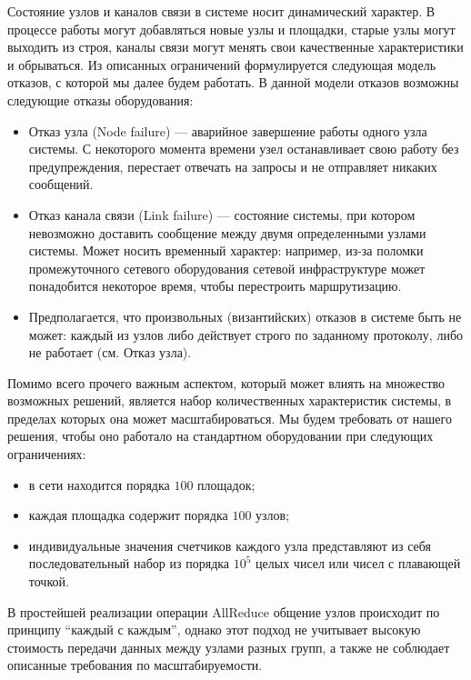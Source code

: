 \documentclass{article}
\theoremstyle{plain}
\theoremstyle{plain}
\theoremstyle{plain}
\theoremstyle{plain}
\theoremstyle{definition}
\theoremstyle{remark}
\theoremstyle{plain}
\begin{document}
Состояние узлов и каналов связи в системе носит динамический характер. В процессе работы могут добавляться новые узлы и площадки, старые узлы могут выходить из строя, каналы связи могут менять свои качественные характеристики и обрываться. Из описанных ограничений формулируется следующая модель отказов, с которой мы далее будем работать. В данной модели отказов возможны следующие отказы оборудования:

\begin{itemize}
    \item Отказ узла (Node failure) — аварийное завершение работы одного узла системы. С некоторого момента времени узел останавливает свою работу без предупреждения, перестает отвечать на запросы и не отправляет никаких сообщений.
    
    \item Отказ канала связи (Link failure) — состояние системы, при котором невозможно доставить сообщение между двумя определенными узлами системы. Может носить временный характер: например, из-за поломки промежуточного сетевого оборудования сетевой инфраструктуре может понадобится некоторое время, чтобы перестроить маршрутизацию.
    
    \item Предполагается, что произвольных (византийских) отказов в системе быть не может: каждый из узлов либо действует строго по заданному протоколу, либо не работает (см. Отказ узла).
\end{itemize}

Помимо всего прочего важным аспектом, который может влиять на множество возможных решений, является набор количественных характеристик системы, в пределах которых она может масштабироваться. Мы будем требовать от нашего решения, чтобы оно работало на стандартном оборудовании при следующих ограничениях:

\begin{itemize}
    \item в сети находится порядка $100$ площадок;
    \item каждая площадка содержит порядка $100$ узлов;
    \item индивидуальные значения счетчиков каждого узла представляют из себя последовательный набор из порядка $10^5$ целых чисел или чисел с плавающей точкой.
\end{itemize}

В простейшей реализации операции AllReduce общение узлов происходит по принципу \enquote{каждый с каждым}, однако этот подход не учитывает высокую стоимость передачи данных между узлами разных групп, а также не соблюдает описанные требования по масштабируемости.
\end{document}
